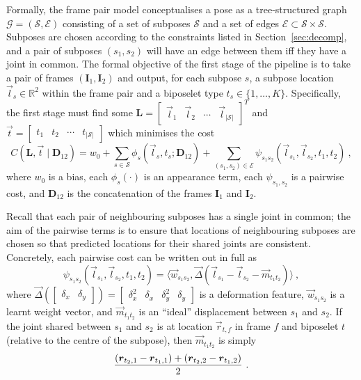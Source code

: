 \documentclass[runningheads]{llncs}
\newcommand{\mat}{\mathbf}
\begin{document}
Formally, the frame pair model conceptualises a pose as a tree-structured graph
$\mathcal G = (\mathcal S, \mathcal E)$ consisting of a set of subposes
$\mathcal S$ and a set of edges $\mathcal E \subset \mathcal S \times \mathcal
S$. Subposes are chosen according to the constraints listed in
Section~\ref{sec:decomp}, and a pair of subposes $(s_1, s_2)$ will have an edge
between them iff they have a joint in common. The formal objective of the first
stage of the pipeline is to take a pair of frames $(\mat I_1, \mat I_2)$ and
output, for each subpose $s$, a subpose location $\vec l_s \in \mathbb R^2$
within the frame pair and a biposelet type $t_s \in \{1, \ldots, K\}$.
Specifically, the first stage must find some $\mat L = \begin{bmatrix}\vec l_1 &
\vec l_2 & \cdots & \vec l_{|\mathcal S|}\end{bmatrix}^T$ and $\vec t =
\begin{bmatrix}t_1 & t_2 & \cdots & t_{|\mathcal S|}\end{bmatrix}$ which
minimises the cost
%
\begin{equation}\label{eqn:full-cost}
C(\mat L, \vec t \mid \mat D_{12})
= w_0 + \sum_{s \in \mathcal S} \phi_s(\vec l_s, t_s; \mat D_{12})
+ \sum_{(s_1, s_2) \in \mathcal E}
    \psi_{s_1 s_2}(\vec l_{s_1}, \vec l_{s_2}, t_1, t_2)~,
\end{equation}
%
where $w_0$ is a bias, each $\phi_s(\cdot)$ is an appearance term, each
$\psi_{s_1,s_2}$ is a pairwise cost, and $\mat D_{12}$ is the concatenation
of the frames $\mat I_1$ and $\mat I_2$.

Recall that each pair of neighbouring subposes has a single joint in common;
the aim of the pairwise terms is to ensure that locations of neighbouring
subposes are chosen so that predicted locations for their shared joints are
consistent. Concretely, each pairwise cost can be written out in full as
%
\begin{equation}\label{eqn:pair-cost}
\psi_{s_1 s_2}(\vec l_{s_1}, \vec l_{s_2}, t_1, t_2)
= \langle
    \vec w_{s_1 s_2},
    \vec \Delta(\vec l_{s_1} - \vec l_{s_2}  - \vec m_{t_1 t_2})
\rangle~,
\end{equation}
%
where $\vec \Delta(\begin{bmatrix}\delta_x & \delta_y\end{bmatrix}) =
\begin{bmatrix}\delta_x^2 & \delta_x & \delta_y^2 & \delta_y\end{bmatrix}$ is a
deformation feature, $\vec w_{s_1 s_2}$ is a learnt weight vector, and
$\vec m_{t_1 t_2}$ is an ``ideal'' displacement between $s_1$ and $s_2$. If the
joint shared between $s_1$ and $s_2$ is at location $\vec r_{t,f}$ in frame $f$
and biposelet $t$ (relative to the centre of the subpose), then $\vec m_{t_1
t_2}$ is simply
\begin{equation}
\frac{%
    \left(\vec r_{t_2,1} - \vec r_{t_1,1}\right)
    + \left(\vec r_{t_2,2} - \vec r_{t_1,2}\right)
}{2}~.
\end{equation}
\end{document}
